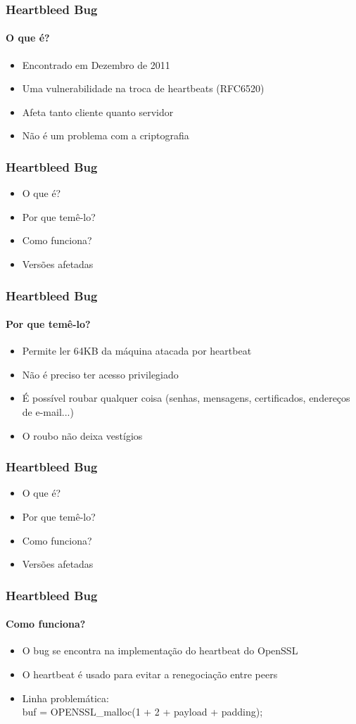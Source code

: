 \documentclass{beamer}
\begin{document}
\begin{frame}
	\frametitle{Heartbleed Bug}
	\framesubtitle{O que é?}
	\begin{itemize}
		\item Encontrado em Dezembro de 2011
		\item Uma vulnerabilidade na troca de heartbeats (RFC6520)
		\item Afeta tanto cliente quanto servidor
		\item Não é um problema com a criptografia
	\end{itemize}
\end{frame}

\begin{frame}
	\frametitle{Heartbleed Bug}
	\begin{itemize}
		\item \textcolor{covered}{O que é?}
		\item Por que temê-lo?
		\item Como funciona?
		\item Versões afetadas
	\end{itemize}
\end{frame}

\begin{frame}
	\frametitle{Heartbleed Bug}
	\framesubtitle{Por que temê-lo?}
	\begin{itemize}
		\item Permite ler 64KB da máquina atacada por heartbeat
		\item Não é preciso ter acesso privilegiado
		\item É possível roubar qualquer coisa (senhas, mensagens, certificados, endereços de e-mail...)
		\item O roubo não deixa vestígios
	\end{itemize}
\end{frame}

\begin{frame}
	\frametitle{Heartbleed Bug}
	\begin{itemize}
		\item \textcolor{covered}{O que é?}
		\item \textcolor{covered}{Por que temê-lo?}
		\item Como funciona?
		\item Versões afetadas
	\end{itemize}
\end{frame}

\begin{frame}
	\frametitle{Heartbleed Bug}
	\framesubtitle{Como funciona?}
	\begin{itemize}
		\item O bug se encontra na implementação do heartbeat do OpenSSL
		\item O heartbeat é usado para evitar a renegociação entre peers
		\item Linha problemática:\\
		\hspace{5 mm}buf = OPENSSL\_malloc(1 + 2 + payload + padding);
	\end{itemize}
\end{frame}
\end{document}
